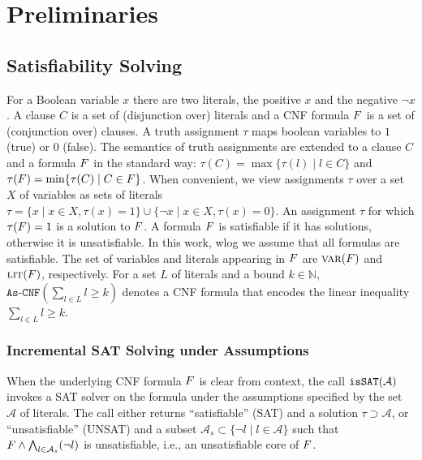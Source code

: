 \chapter{Preliminaries\label{chap:preliminaries}}


\section{Satisfiability Solving\label{sec:sat}}

For a Boolean variable $x$ there are two literals, the positive $x$ and the negative $\lnot x$. 
A clause $C$ is a set of (disjunction over) literals and a CNF formula $F$ is a set of (conjunction over) 
clauses. A truth assignment $\tau$  maps boolean variables to $1$ (true) or $0$ (false). The semantics of truth assignments 
are extended to a clause $C$ and a formula $F$ in the standard way: $\tau(C) = \max\{ \tau(l) \mid l \in C\}$ and $\tau(F) = \min\{\tau(C) \mid C \in F\}$.
When convenient, we view assignments $\tau$ over a set $X$ of variables as sets of literals $\tau = \{ x \mid x \in X,  \tau(x) = 1\} \cup \{ \lnot x \mid x \in X, \tau(x) = 0\}$.
An assignment $\tau$ for which $\tau(F) = 1$ is a solution to $F$. A formula $F$ is satisfiable if it has solutions, otherwise it is unsatisfiable. 
In this work, wlog we assume that all formulas are satisfiable.
The set of variables and literals appearing in $F$ are $\textsc{var}(F)$ and $\textsc{lit}(F)$, respectively.  
For a set $L$ of literals and a bound $k \in \mathbb{N}$, $\texttt{As-CNF}\left(\sum_{l \in L} l \geq k\right)$ denotes a CNF formula that encodes
the linear inequality $\sum_{l \in L} l \geq k$. %

\subsection{Incremental SAT Solving under Assumptions\label{sec:inc-sat}}


When the underlying CNF formula $F$ is clear from context, the call $\texttt{isSAT}(\mathcal{A})$ invokes a SAT solver on the formula
under the assumptions specified by the set $\mathcal{A}$ of literals. The call either returns ``satisfiable'' (SAT) and a solution $\tau \supset \mathcal{A}$, or
``unsatisfiable'' (UNSAT) and a subset $\mathcal{A}_s \subset \{\lnot l \mid l\in\mathcal{A}\}$ such that $F \land \bigwedge_{l \in \mathcal{A}_s} (\lnot l)$ is unsatisfiable, i.e., an
unsatisfiable core of $F$.

